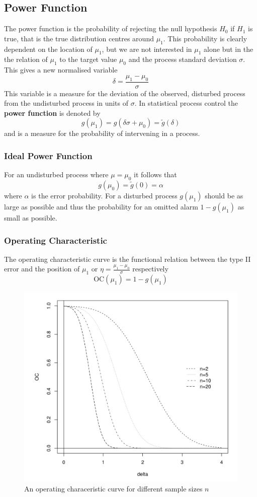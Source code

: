 \documentclass[11pt]{article}
\theoremstyle{definition}
\begin{document}
\subsection{Power Function}
The power function is the probability of rejecting the null hypothesis $H_0$ if $H_1$ is true, that is the true distribution centres around $\mu_1$. This probability is clearly dependent on the location of $\mu_1$, but we are not interested in $\mu_1$ alone but in the the relation of $\mu_1$ to the target value $\mu_0$ and the process standard deviation $\sigma$. This gives a new normalised variable
\begin{equation*}
	\delta = \frac{\mu_1 - \mu_0}{\sigma}
\end{equation*}
This variable is a measure for the deviation of the observed, disturbed process from the undisturbed process in units of $\sigma$. In statistical process control the \textbf{power function} is denoted by
\begin{equation*}
	g(\mu_1) = g(\delta\sigma + \mu_0) = \tilde{g}(\delta)
\end{equation*}
and is a measure for the probability of intervening in a process.

\subsubsection{Ideal Power Function}
For an undisturbed process where $\mu = \mu_0$ it follows that
\begin{equation*}
	g(\mu_0) = \tilde{g}(0) = \alpha
\end{equation*}
where $\alpha$ is the error probability. For a disturbed process $g(\mu_1)$ should be as large as possible and thus the probability for an omitted alarm $1-g(\mu_1)$ as small as possible.

\subsubsection{Operating Characteristic}
The operating characteristic curve is the functional relation between the type II error and the position of $\mu_1$ or $\eta = \frac{\mu_1 - \mu_0}{\sigma}$ respectively
\begin{equation*}
	\text{OC}(\mu_1) = 1 - g(\mu_1)
\end{equation*}

\begin{figure}[H]
	\centering
	\includegraphics[width=0.4\linewidth]{img/OC_curve}
	\caption{An operating characeristic curve for different sample sizes $n$}
	\label{fig:occurve}
\end{figure}
\end{document}
